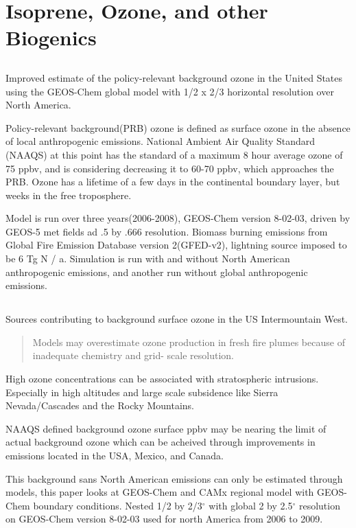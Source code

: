 \section{Isoprene, Ozone, and other Biogenics}

\subsection{\cite{Zhang_2011}}
Improved estimate of the policy-relevant background ozone in the United States using the GEOS-Chem global model with 1/2 x 2/3 horizontal resolution over North America.

Policy-relevant background(PRB) ozone is defined as surface ozone in the absence of local anthropogenic emissions.
National Ambient Air Quality Standard (NAAQS) at this point has the standard of a maximum  8 hour average ozone of 75 ppbv, and is considering decreasing it to 60-70 ppbv, which approaches the PRB. Ozone has a lifetime of a few days in the continental boundary layer, but weeks in the free troposphere.

Model is run over three years(2006-2008), GEOS-Chem version 8-02-03, driven by GEOS-5 met fields ad .5 by .666 resolution. Biomass burning emissions from Global Fire Emission Database version 2(GFED-v2), lightning source imposed to be 6 Tg N / a.
Simulation is run with and without North American anthropogenic emissions, and another run without global anthropogenic emissions.

\subsection{\cite{Zhang_2014}}
Sources contributing to background surface ozone in the US
Intermountain West.

\begin{quote}
Models may overestimate ozone production in
fresh fire plumes because of inadequate chemistry and grid-
scale resolution.
\end{quote}

High ozone concentrations can be associated with stratospheric intrusions.
Especially in high altitudes and large scale subsidence like Sierra Nevada/Cascades and the Rocky Mountains.

NAAQS defined background ozone surface ppbv may be nearing the limit of actual background ozone which can be acheived through improvements in emissions located in the USA, Mexico, and Canada.

This background sans North American emissions can only be estimated through models, this paper looks at GEOS-Chem and CAMx regional model with GEOS-Chem boundary conditions.
Nested 1/2 by 2/3$^{\circ}$ with global 2 by 2.5$^{\circ}$ resolution on GEOS-Chem version 8-02-03 used for north America from 2006 to 2009.

